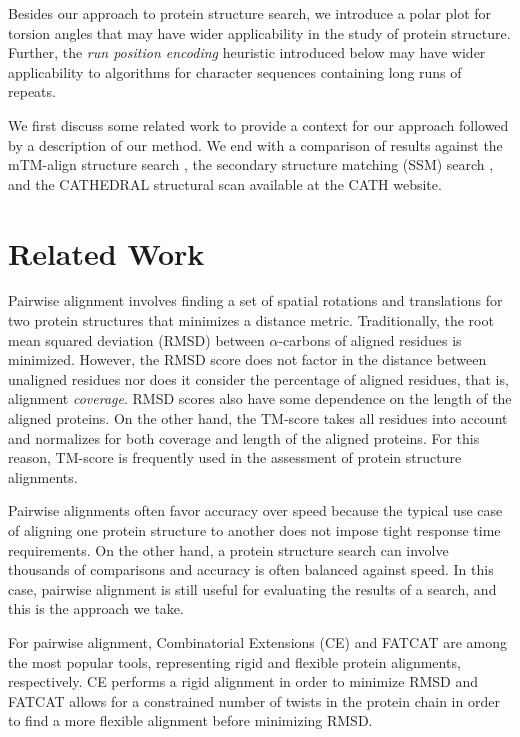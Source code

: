 \documentclass[10pt,letterpaper]{article}
\newcommand{\cas}{$\alpha$-carbons\xspace}
\begin{document}
Besides our approach to protein structure search, we introduce a polar plot for torsion angles that may have wider applicability in the study of protein structure. 
Further, the \emph{run position encoding} heuristic introduced below may have wider applicability to algorithms for character sequences containing long runs of repeats. 

We first discuss some related work to provide a context for our approach followed by a description of our method. 
We end with a comparison of results against the mTM-align structure search \cite{Dong2018}, the secondary structure matching (SSM) search \cite{Krissinel2004}, and the CATHEDRAL structural scan \cite{Redfern2007} available at the CATH website.

\section*{Related Work}

Pairwise alignment involves finding a set of spatial rotations and translations for two protein structures that minimizes a distance metric. 
Traditionally, the root mean squared deviation (RMSD) between \cas of aligned residues is minimized.
However, the RMSD score does not factor in the distance between unaligned residues nor does it consider the percentage of aligned residues, that is, alignment \emph{coverage}. 
RMSD scores also have some dependence on the length of the aligned proteins. 
On the other hand, the TM-score \cite{Zhang2004} takes all residues into account and normalizes for both coverage and length of the aligned proteins. 
For this reason, TM-score is frequently used in the assessment of protein structure alignments. 

Pairwise alignments often favor accuracy over speed because the typical use case of aligning one protein structure to another does not impose tight response time requirements. 
On the other hand, a protein structure search can involve thousands of comparisons and accuracy is often balanced against speed. 
In this case, pairwise alignment is still useful for evaluating the results of a search, and this is the approach we take. 

For pairwise alignment, Combinatorial Extensions (CE) \cite{Shindyalov1998} and FATCAT \cite{Ye2003} are among the most popular tools, representing rigid and flexible protein alignments, respectively. 
CE performs a rigid alignment in order to minimize RMSD and FATCAT allows for a constrained number of twists in the protein chain in order to find a more flexible alignment before minimizing RMSD.
\end{document}
